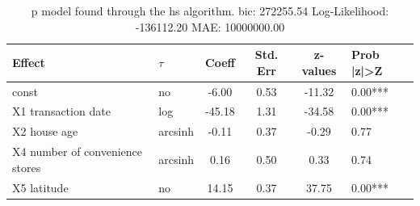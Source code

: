 \begin{table}
	\caption{p model found through the hs algorithm. bic: 272255.54 Log-Likelihood: -136112.20 MAE: 10000000.00}
	\begin{center}
		\begin{tabular}{|l|l|c|c|c|l|}
			\hline
			Effect & $\tau$ & Coeff & Std. Err & z-values & Prob |z|>Z \\
			\hline
			const & no & -6.00 & 0.53 & -11.32 & 0.00*** \\
			\hline
			X1 transaction date & log & -45.18 & 1.31 & -34.58 & 0.00*** \\
			\hline
			X2 house age & arcsinh & -0.11 & 0.37 & -0.29 & 0.77 \\
			\hline
			X4 number of convenience stores & arcsinh & 0.16 & 0.50 & 0.33 & 0.74 \\
			\hline
			X5 latitude & no & 14.15 & 0.37 & 37.75 & 0.00*** \\
			\hline
		\end{tabular}
	\end{center}
\end{table}